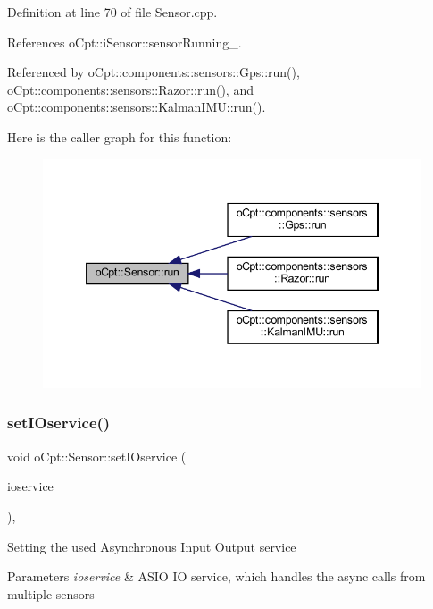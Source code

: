 Definition at line 70 of file Sensor.\+cpp.



References o\+Cpt\+::i\+Sensor\+::sensor\+Running\+\_\+.



Referenced by o\+Cpt\+::components\+::sensors\+::\+Gps\+::run(), o\+Cpt\+::components\+::sensors\+::\+Razor\+::run(), and o\+Cpt\+::components\+::sensors\+::\+Kalman\+I\+M\+U\+::run().

Here is the caller graph for this function\+:
\nopagebreak
\begin{figure}[H]
\begin{center}
\leavevmode
\includegraphics[width=346pt]{classo_cpt_1_1_sensor_aef25b0e5f3a8358ee81c97c73909fbe6_icgraph}
\end{center}
\end{figure}
\hypertarget{classo_cpt_1_1_sensor_ae7d47e18df5eb7854bf71fbbee9568df}{}\label{classo_cpt_1_1_sensor_ae7d47e18df5eb7854bf71fbbee9568df} 
\subsubsection{\texorpdfstring{set\+I\+Oservice()}{setIOservice()}}
{\footnotesize\ttfamily void o\+Cpt\+::\+Sensor\+::set\+I\+Oservice (\begin{DoxyParamCaption}\item[{boost\+::shared\+\_\+ptr$<$ boost\+::asio\+::io\+\_\+service $>$}]{ioservice }\end{DoxyParamCaption})\hspace{0.3cm}{\ttfamily [override]}, {\ttfamily [virtual]}}

Setting the used Asynchronous Input Output service 
\begin{DoxyParams}{Parameters}
{\em ioservice} & A\+S\+IO IO service, which handles the async calls from multiple sensors \\
\hline
\end{DoxyParams}


